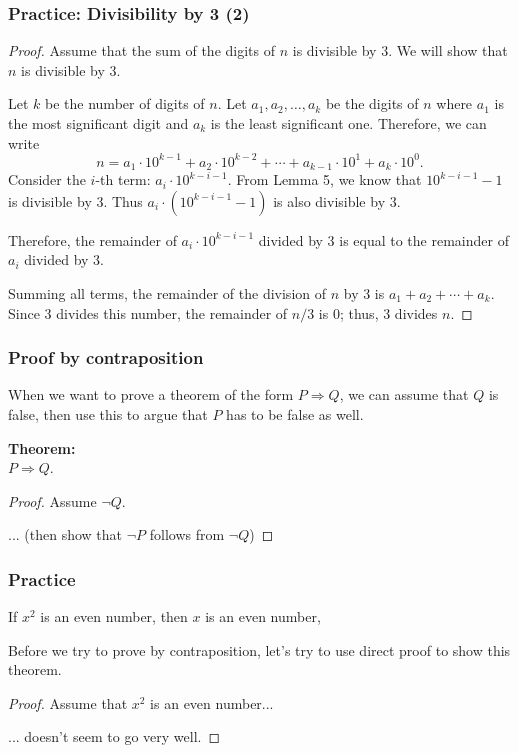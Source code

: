 \begin{frame}\frametitle{Practice: Divisibility by 3 (2)}
  {\small
    \begin{proof}
      Assume that the sum of the digits of $n$ is divisible by $3$.
      We will show that $n$ is divisible by $3$.
      
      Let $k$ be the number of digits of $n$.  Let
      $a_1,a_2,\ldots,a_k$ be the digits of $n$ where $a_1$ is the
      most significant digit and $a_k$ is the least significant one.
      Therefore, we can write
      \[ n = a_1\cdot 10^{k-1} + a_2\cdot 10^{k-2} + \cdots + a_{k-1}\cdot 10^1 + a_k\cdot 10^0.\]
      Consider the $i$-th term: $a_i\cdot 10^{k-i-1}$.  From Lemma 5,
      we know that $10^{k-i-1} - 1$ is divisible by 3.  Thus
      $a_i\cdot(10^{k-i-1}-1)$ is also divisible by $3$.

      Therefore, the remainder of $a_i\cdot 10^{k-i-1}$ divided by $3$
      is equal to the remainder of $a_i$ divided by $3$.

      Summing all terms, the remainder of the division of $n$ by $3$
      is $a_1+a_2+\cdots+ a_k$.  Since $3$ divides this number, the
      remainder of $n/3$ is 0; thus, $3$ divides $n$.
    \end{proof}
  }
\end{frame}

\begin{frame}\frametitle{Proof by contraposition}
  When we want to prove a theorem of the form $P\Rightarrow Q$, we can
  assume that $Q$ is false, then use this to argue that $P$ has to be
  false as well.

  \begin{tcolorbox}[title=Proof by contraposition]
    {\bf Theorem:} \\
    $P\Rightarrow Q$.
    \begin{proof}
      Assume $\neg Q$.
      
      ... (then show that $\neg P$ follows from $\neg Q$)
    \end{proof}
  \end{tcolorbox}
\end{frame}

\begin{frame}\frametitle{Practice}
  \begin{theorem}
    If $x^2$ is an even number, then $x$ is an even number, 
  \end{theorem} \pause

  Before we try to prove by contraposition, let's try to use direct
  proof to show this theorem. \pause

  \begin{proof}
    Assume that $x^2$ is an even number...

    \vspace{1.2in} \pause

    ... doesn't seem to go very well.
  \end{proof}
\end{frame}

